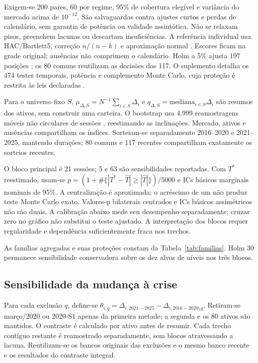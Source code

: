 Exigem-se 200 pares, 60 por regime, 95\% de cobertura elegível e variância
do mercado acima de $10^{-12}$. São salvaguardas contra ajustes curtos
e perdas de calendário, sem garantia de potência ou validade assintótica.
Não se relaxam pisos, preenchem lacunas ou descartam insuficiências.
A referência individual usa HAC/Bartlett5, correção $n/(n-k)$ e
aproximação normal \cite{neweywest1987}. Escores ficam na grade original;
ausências não comprimem o calendário. Holm a 5\% ajusta 197 posições
\cite{holm1979}; os 80 comuns reutilizam as decisões dos 117.
O suplemento detalha os 474 testes temporais, potência e complemento
Monte Carlo, cuja proteção é restrita às leis declaradas
\cite{morris2019,dufour2006,phipson2010}.

Para o universo fixo $S $, $\mu_{\Delta,S}=N^{-1}\sum_{i\in S}\Delta_i $
e $q_{\Delta,S}=\mathrm{mediana}_{i\in S}\Delta_i $ são resumos dos ativos,
sem construir uma carteira. O bootstrap usa 4.999 reamostragens móveis
não circulares de sessões \cite{kunsch1989}, reestimando as inclinações.
Mercado, ativos e ausências compartilham os índices. Sorteiam-se
separadamente 2016--2020 e 2021--2025, mantendo durações; 80 comuns
e 117 recentes compartilham exatamente os sorteios recentes.

O bloco principal é 21 sessões; 5 e 63 são sensibilidades reportadas.
Com $T^*$ reestimado, usam-se
$p=(1+\#\{|T^*-\widehat T|\ge|\widehat T|\})/5000$
e ICs básicos marginais nominais de 95\%. A centralização é aproximada;
o acréscimo de um não produz teste Monte Carlo exato. Valores-p bilaterais
centrados e ICs básicos assimétricos não são duais. A calibração
abaixo mede seu desempenho separadamente; cruzar zero no gráfico
não substitui o teste ajustado. A interpretação dos blocos requer
regularidade e dependência suficientemente fraca nos trechos.

As famílias agregadas e suas proteções constam da Tabela~\ref{tab:familias}.
Holm 30 permanece sensibilidade conservadora sobre os dez alvos de níveis nos três blocos.

\subsection{Sensibilidade da mudança à crise}
\label{sec:crise}
Para cada exclusão $q $, define-se
$\theta_{i,q}=\Delta_{i, 2021-2025}-\Delta_{i, 2016-2020\setminus q}$.
Retiram-se março/2020 ou 2020-S1 apenas da primeira metade; a segunda
e os 80 ativos são mantidos. O contraste é calculado por ativo antes
de resumir. Cada trecho contíguo restante é reamostrado separadamente,
sem blocos atravessando a lacuna. Reutilizam-se os bancos originais
das exclusões e o mesmo banco recente e os resultados do contraste integral.

